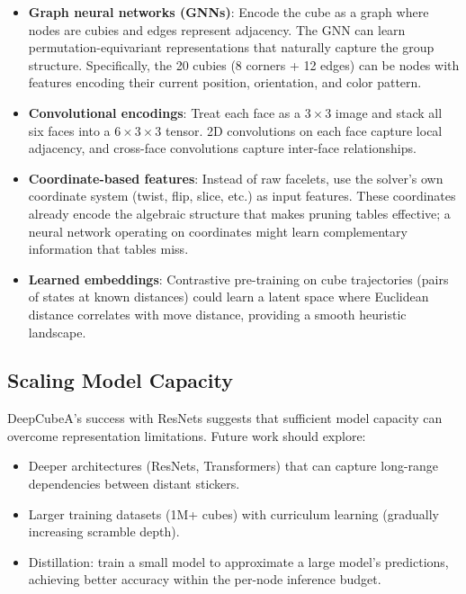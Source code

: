 \documentclass[10pt,twocolumn,a4paper]{article}
\begin{document}
\begin{itemize}[leftmargin=*]
  \item \textbf{Graph neural networks (GNNs)}: Encode the cube as a graph where nodes are cubies and edges represent adjacency. The GNN can learn permutation-equivariant representations that naturally capture the group structure. Specifically, the 20 cubies (8 corners + 12 edges) can be nodes with features encoding their current position, orientation, and color pattern.
  
  \item \textbf{Convolutional encodings}: Treat each face as a $3{\times}3$ image and stack all six faces into a $6{\times}3{\times}3$ tensor. 2D convolutions on each face capture local adjacency, and cross-face convolutions capture inter-face relationships.
  
  \item \textbf{Coordinate-based features}: Instead of raw facelets, use the solver's own coordinate system (twist, flip, slice, etc.) as input features. These coordinates already encode the algebraic structure that makes pruning tables effective; a neural network operating on coordinates might learn complementary information that tables miss.
  
  \item \textbf{Learned embeddings}: Contrastive pre-training on cube trajectories (pairs of states at known distances) could learn a latent space where Euclidean distance correlates with move distance, providing a smooth heuristic landscape.
\end{itemize}

\subsection{Scaling Model Capacity}
DeepCubeA's success with ResNets suggests that sufficient model capacity can overcome representation limitations. Future work should explore:

\begin{itemize}[leftmargin=*]
  \item Deeper architectures (ResNets, Transformers) that can capture long-range dependencies between distant stickers.
  \item Larger training datasets (1M+ cubes) with curriculum learning (gradually increasing scramble depth).
  \item Distillation: train a small model to approximate a large model's predictions, achieving better accuracy within the per-node inference budget.
\end{itemize}
\end{document}
